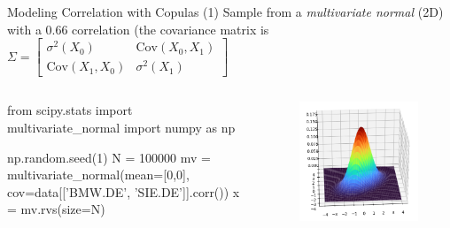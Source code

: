 \documentclass{beamer}
\begin{document}
\begin{frame}[fragile]{Modeling Correlation with Copulas (1)}
  Sample from a \emph{multivariate normal} (2D) with a 0.66 correlation (the covariance matrix is $
      \Sigma = \begin{bmatrix}
        \sigma^2 (X_0) & \mathrm{Cov}(X_0, X_1)\\
        \mathrm{Cov}(X_1, X_0) & \sigma^2 (X_1)
      \end{bmatrix}$
  \begin{columns}
    \begin{ipython}
from scipy.stats import multivariate_normal
import numpy as np
      
np.random.seed(1)
N = 100000
mv = multivariate_normal(mean=[0,0],
         cov=data[['BMW.DE', 'SIE.DE']].corr())
x = mv.rvs(size=N)
\end{ipython}
  \begin{figure}[h]
    \begin{center}
      \includegraphics[width=0.9\linewidth]{3d_gauss_corr}
    \end{center}
  \end{figure}
  \end{columns}
\end{frame}
\end{document}
